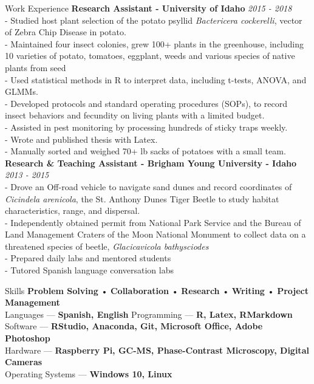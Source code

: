 \documentclass{resume} %
\begin{document}
\begin{rSection}{Work Experience}
\textbf{Research Assistant - University of Idaho} \hfill {\em \textit{2015 - 2018}}\\
- Studied host plant selection of the potato psyllid \textit{Bactericera cockerelli}, vector of Zebra Chip Disease in potato.\\
- Maintained four insect colonies, grew 100+ plants in the greenhouse, including 10 varieties of potato, tomatoes, eggplant, weeds and various species of native plants from seed\\
- Used statistical methods in R to interpret data, including t-tests, ANOVA, and GLMMs.\\
- Developed protocols and standard operating procedures (SOPs), to record insect behaviors and fecundity on living plants with a limited budget.\\
- Assisted in pest monitoring by processing hundreds of sticky traps weekly.\\
- Wrote and published thesis with Latex.\\
- Manually sorted and weighed 70+ lb sacks of potatoes with a small team.\\

\textbf{Research \& Teaching Assistant - Brigham Young University - Idaho} \hfill {\em \textit{2013 - 2015}}\\
- Drove an Off-road vehicle to navigate sand dunes and record coordinates of \textit{Cicindela arenicola}, the St. Anthony Dunes Tiger Beetle to study habitat characteristics, range, and dispersal.\\
- Independently obtained permit from National Park Service and the Bureau of Land Management Craters of the Moon National Monument to collect data on a threatened species of beetle, \textit{Glacicavicola bathysciodes}\\
- Prepared daily labs and mentored students\\
- Tutored Spanish language conversation labs\\
	\hfill
\end{rSection}


\begin{rSection}{Skills}
\textbf{Problem Solving} • \textbf{Collaboration} • \textbf{Research} • \textbf{Writing} • \textbf{Project Management}\\
Languages --- \textbf{Spanish, English} \hfill Programming --- \textbf{R, Latex, RMarkdown}\\   
Software --- \textbf{RStudio, Anaconda, Git, Microsoft Office, Adobe Photoshop}\\
Hardware --- \textbf{Raspberry Pi, GC-MS, Phase-Contrast Microscopy, Digital Cameras}\\
Operating Systems --- \textbf{Windows 10, Linux}
\end{rSection}
\end{document}
